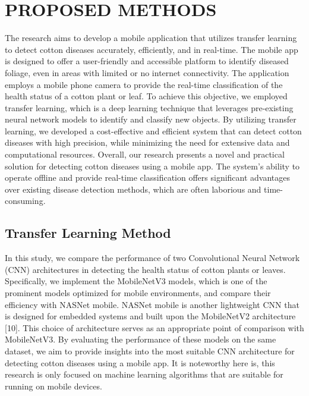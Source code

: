 \documentclass[conference]{IEEEtran}
\begin{document}
\section{PROPOSED METHODS}
The research aims to develop a mobile application that utilizes transfer learning to detect cotton diseases accurately, efficiently, and in real-time. The mobile app is designed to offer a user-friendly and accessible platform to identify diseased foliage, even in areas with limited or no internet connectivity. The application employs a mobile phone camera to provide the real-time classification of the health status of a cotton plant or leaf.
To achieve this objective, we employed transfer learning, which is a deep learning technique that leverages pre-existing neural network models to identify and classify new objects. By utilizing transfer learning, we developed a cost-effective and efficient system that can detect cotton diseases with high precision, while minimizing the need for extensive data and computational resources. Overall, our research presents a novel and practical solution for detecting cotton diseases using a mobile app. The system's ability to operate offline and provide real-time classification offers significant advantages over existing disease detection methods, which are often laborious and time-consuming.

\subsection{Transfer Learning Method}
In this study, we compare the performance of two Convolutional Neural Network (CNN) architectures in detecting the health status of cotton plants or leaves. Specifically, we implement the MobileNetV3 models, which is one of the prominent models optimized for mobile environments, and compare their efficiency with NASNet mobile. NASNet mobile is another lightweight CNN that is designed for embedded systems and built upon the MobileNetV2 architecture [10]. This choice of architecture serves as an appropriate point of comparison with MobileNetV3. By evaluating the performance of these models on the same dataset, we aim to provide insights into the most suitable CNN architecture for detecting cotton diseases using a mobile app. It is noteworthy here is, this research is only focused on machine learning algorithms that are suitable for running on mobile devices. 
\end{document}
